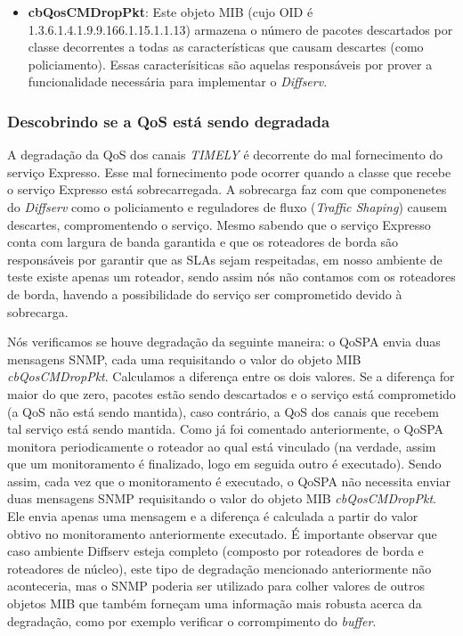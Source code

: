 \begin{itemize}
\item \textbf{cbQosCMDropPkt}: Este objeto MIB (cujo OID é 1.3.6.1.4.1.9.9.166.1.15.1.1.13) armazena o número de pacotes descartados por classe decorrentes a todas as características que causam descartes (como policiamento). Essas caracterísiticas são aquelas responsáveis por prover a funcionalidade necessária para implementar o \textit{Diffserv}.
\end{itemize}

\subsubsection{Descobrindo se a QoS está sendo degradada}
	
	A degradação da QoS dos canais \textit{TIMELY} é decorrente do mal fornecimento do serviço Expresso. Esse mal fornecimento pode ocorrer quando a classe que recebe o serviço Expresso está sobrecarregada. A sobrecarga faz com que componenetes do \textit{Diffserv} como o policiamento e reguladores de fluxo (\textit{Traffic Shaping}) causem descartes, compromentendo o serviço. Mesmo sabendo que o serviço Expresso conta com largura de banda garantida e que os roteadores de borda são responsáveis por garantir que as SLAs sejam respeitadas, em nosso ambiente de teste existe apenas um roteador, sendo assim nós não contamos com os roteadores de borda, havendo a possibilidade do serviço ser comprometido devido à sobrecarga.
	
	Nós verificamos se houve degradação da seguinte maneira: o QoSPA envia duas mensagens SNMP, cada uma requisitando o valor do objeto MIB \textit{cbQosCMDropPkt}. Calculamos a diferença entre os dois valores. Se a diferença for maior do que zero, pacotes estão sendo descartados e o serviço está comprometido (a QoS não está sendo mantida), caso contrário, a QoS dos canais que recebem tal serviço está sendo mantida. Como já foi comentado anteriormente, o QoSPA monitora periodicamente o roteador ao qual está vinculado (na verdade, assim que um monitoramento é finalizado, logo em seguida outro é executado). Sendo assim, cada vez que o monitoramento é executado, o QoSPA não necessita enviar duas mensagens SNMP requisitando o valor do objeto MIB \textit{cbQosCMDropPkt}. Ele envia apenas uma mensagem e a diferença é calculada a partir do valor obtivo no monitoramento anteriormente executado. É importante observar que caso ambiente Diffserv esteja completo (composto por roteadores de borda e roteadores de núcleo), este tipo de degradação mencionado anteriormente não aconteceria, mas o SNMP poderia ser utilizado para colher valores de outros objetos MIB que também forneçam uma informação mais robusta acerca da degradação, como por exemplo verificar o corrompimento do \textit{buffer}.
	
